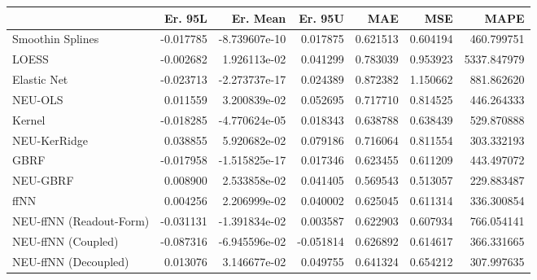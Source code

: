 \begin{tabular}{lrrrrrr}
\toprule
{} &   Er. 95L &      Er. Mean &   Er. 95U &       MAE &       MSE &         MAPE \\
\midrule
Smoothin Splines        & -0.017785 & -8.739607e-10 &  0.017875 &  0.621513 &  0.604194 &   460.799751 \\
LOESS                   & -0.002682 &  1.926113e-02 &  0.041299 &  0.783039 &  0.953923 &  5337.847979 \\
Elastic Net             & -0.023713 & -2.273737e-17 &  0.024389 &  0.872382 &  1.150662 &   881.862620 \\
NEU-OLS                 &  0.011559 &  3.200839e-02 &  0.052695 &  0.717710 &  0.814525 &   446.264333 \\
Kernel                  & -0.018285 & -4.770624e-05 &  0.018343 &  0.638788 &  0.638439 &   529.870888 \\
NEU-KerRidge            &  0.038855 &  5.920682e-02 &  0.079186 &  0.716064 &  0.811554 &   303.332193 \\
GBRF                    & -0.017958 & -1.515825e-17 &  0.017346 &  0.623455 &  0.611209 &   443.497072 \\
NEU-GBRF                &  0.008900 &  2.533858e-02 &  0.041405 &  0.569543 &  0.513057 &   229.883487 \\
ffNN                    &  0.004256 &  2.206999e-02 &  0.040002 &  0.625045 &  0.611314 &   336.300854 \\
NEU-ffNN (Readout-Form) & -0.031131 & -1.391834e-02 &  0.003587 &  0.622903 &  0.607934 &   766.054141 \\
NEU-ffNN (Coupled)      & -0.087316 & -6.945596e-02 & -0.051814 &  0.626892 &  0.614617 &   366.331665 \\
NEU-ffNN (Decoupled)    &  0.013076 &  3.146677e-02 &  0.049755 &  0.641324 &  0.654212 &   307.997635 \\
\bottomrule
\end{tabular}
